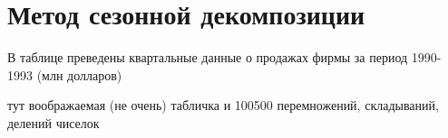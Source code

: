 \documentclass[a4paper]{article}
\theoremstyle{definition}
\theoremstyle{remark}
\begin{document}
\section*{\centering Метод сезонной декомпозиции}

В таблице преведены квартальные данные о продажах фирмы за период 1990-1993
(млн долларов)

тут воображаемая (не очень) табличка
и 100500 перемножений, складываний, делений чиселок

\end{document}
